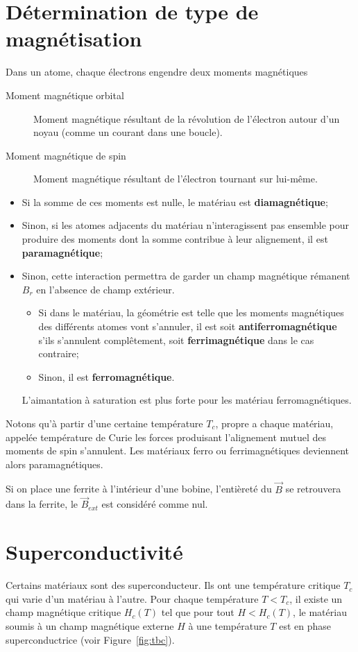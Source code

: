 \documentclass[11pt,a4paper]{article}
\newcommand{\B}{\vec B}
\begin{document}
\section{Détermination de type de magnétisation}
Dans un atome, chaque électrons engendre deux moments magnétiques
\begin{description}
	\item[Moment magnétique orbital]
		Moment magnétique résultant de la révolution de l'électron autour d'un noyau (comme un courant dans une boucle).
	\item[Moment magnétique de spin]
		Moment magnétique résultant de l'électron tournant sur lui-même.
\end{description}
\begin{itemize}
	\item Si la somme de ces moments est nulle, le matériau est \textbf{diamagnétique};
	\item Sinon, si les atomes adjacents du matériau n'interagissent pas ensemble pour produire des moments dont la somme contribue à leur alignement, il est \textbf{paramagnétique};
	\item Sinon, cette interaction permettra de garder un champ magnétique rémanent $B_r$ en l'absence de champ extérieur.
		\begin{itemize}
			\item Si dans le matériau, la géométrie est telle que les moments magnétiques des différents atomes vont s'annuler, il est soit \textbf{antiferromagnétique} s'ils s'annulent complêtement, soit \textbf{ferrimagnétique} dans le cas contraire;
			\item Sinon, il est \textbf{ferromagnétique}.
		\end{itemize}
		L'aimantation à saturation est plus forte pour les matériau ferromagnétiques.
\end{itemize}
Notons qu'à partir d'une certaine température $T_c$, propre a chaque matériau, appelée température de Curie les forces produisant l'alignement mutuel des moments de spin s'annulent. Les matériaux ferro ou ferrimagnétiques deviennent alors paramagnétiques.

Si on place une ferrite à l'intérieur d'une bobine, l'entièreté du $\B$ se retrouvera dans la ferrite, le $\B_{ext}$ est considéré comme nul.

\section{Superconductivité}
Certains matériaux sont des superconducteur.
Ils ont une température critique $T_c$ qui varie d'un matériau à l'autre.
Pour chaque température $T < T_c$, il existe un champ magnétique critique $H_c(T)$ tel que
pour tout $H < H_c(T)$, le matériau soumis à un champ magnétique externe $H$ à une température $T$ est en phase superconductrice
(voir Figure~\ref{fig:tbc}).
\end{document}
